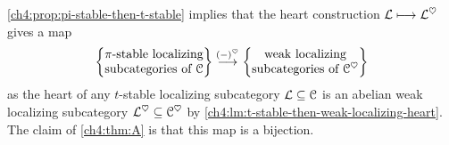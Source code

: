 





\cref{ch4:prop:pi-stable-then-t-stable} implies that the heart construction $\L\longmapsto \L^\heart$ gives a map 
\[\pistable\overset{(-)^\heart}\to \weaklocalizing\] 
as the heart of any $t$-stable localizing subcategory $\L\subseteq \C$ is an abelian weak localizing subcategory $\L^\heart \subseteq \C^\heart$ by \cref{ch4:lm:t-stable-then-weak-localizing-heart}. The claim of \cref{ch4:thm:A} is that this map is a bijection. 

